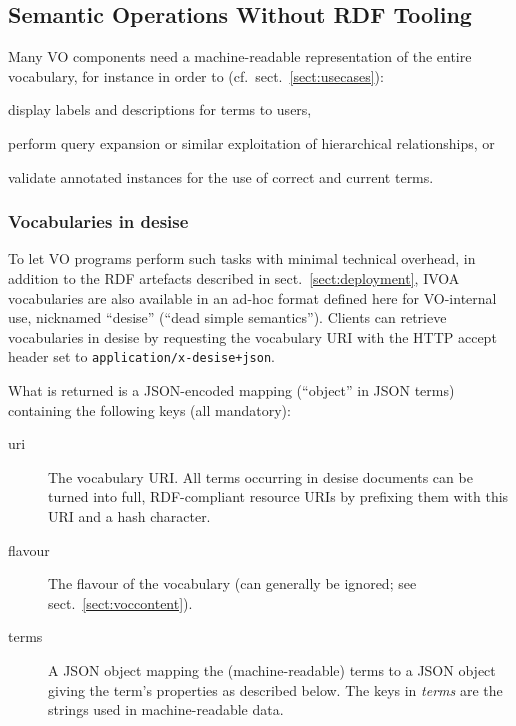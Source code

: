 \documentclass[11pt,a4paper]{ivoa}
\begin{document}
\subsection{Semantic Operations Without RDF Tooling}
\label{sect:desise}

Many VO components need a machine-readable representation of the
entire vocabulary, for instance in order to
(cf.~sect.~\ref{sect:usecases}):

\begin{compactitem}
\item display labels and descriptions for terms to users,
\item perform query expansion or similar exploitation of hierarchical
relationships, or
\item validate annotated instances for the use of correct and current
terms.
\end{compactitem}

\subsubsection{Vocabularies in desise}

To let VO programs perform such tasks with minimal technical overhead,
in addition to the RDF artefacts described in
sect.~\ref{sect:deployment}, IVOA vocabularies are also available in an
ad-hoc format defined here for VO-internal use, nicknamed ``desise''
(``dead simple semantics'').  Clients can retrieve vocabularies in
desise by requesting the vocabulary URI with the HTTP accept header set
to \texttt{application/x-desise+json}.

What is returned is a JSON-encoded \citep{std:JSON} mapping (``object''
in JSON terms)
containing the following keys (all mandatory):

\begin{description}
\item[uri] The vocabulary URI.  All terms occurring in desise documents
can be turned into full, RDF-compliant resource URIs by prefixing them
with this URI and a hash character.
\item[flavour] The flavour of the vocabulary (can generally be ignored;
see sect.~\ref{sect:voccontent}).

\item[terms] A JSON object mapping the (machine-readable) terms to a
JSON object giving the term's properties as described below.
The keys in \textit{terms} are the strings used in
machine-readable data.
\end{description}
\end{document}
